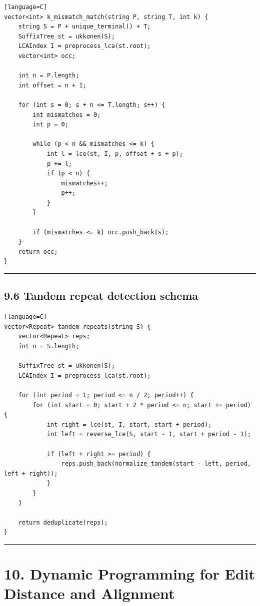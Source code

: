 \documentclass[11pt]{article}
\begin{document}
\begin{verbatim}[language=C]
vector<int> k_mismatch_match(string P, string T, int k) {
    string S = P + unique_terminal() + T;
    SuffixTree st = ukkonen(S);
    LCAIndex I = preprocess_lca(st.root);
    vector<int> occ;

    int n = P.length;
    int offset = n + 1;

    for (int s = 0; s + n <= T.length; s++) {
        int mismatches = 0;
        int p = 0;

        while (p < n && mismatches <= k) {
            int l = lce(st, I, p, offset + s + p);
            p += l;
            if (p < n) {
                mismatches++;
                p++;
            }
        }

        if (mismatches <= k) occ.push_back(s);
    }
    return occ;
}
\end{verbatim}

\begin{center}\rule{0.5\linewidth}{0.5pt}\end{center}

\subsection{9.6 Tandem repeat detection schema}\label{tandem-repeat-detection-schema}

\begin{verbatim}[language=C]
vector<Repeat> tandem_repeats(string S) {
    vector<Repeat> reps;
    int n = S.length;

    SuffixTree st = ukkonen(S);
    LCAIndex I = preprocess_lca(st.root);

    for (int period = 1; period <= n / 2; period++) {
        for (int start = 0; start + 2 * period <= n; start += period) {
            int right = lce(st, I, start, start + period);
            int left = reverse_lce(S, start - 1, start + period - 1);

            if (left + right >= period) {
                reps.push_back(normalize_tandem(start - left, period, left + right));
            }
        }
    }

    return deduplicate(reps);
}
\end{verbatim}

\begin{center}\rule{0.5\linewidth}{0.5pt}\end{center}

\section{10. Dynamic Programming for Edit Distance and Alignment}\label{dynamic-programming-for-edit-distance-and-alignment}
\end{document}
